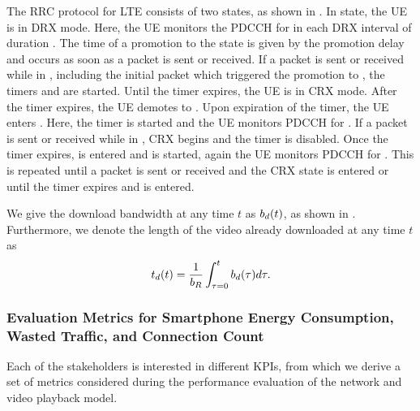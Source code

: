 The \gls{RRC} protocol for \gls{LTE} consists of two states, as shown in .
In \rrcidle state, the \gls{UE} is in \gls{DRX} mode.
Here, the \gls{UE} monitors the \gls{PDCCH} for \tonidle in each \gls{DRX} interval of duration \tdrxidle.
The time of a promotion to the \rrcconnected state is given by the promotion delay \promotiondelay and occurs as soon as a packet is sent or received.
If a packet is sent or received while in \rrcconnected, including the initial packet which triggered the promotion to \rrcconnected, the timers \tdrxinactivity and \tidle are started.
Until the \tdrxinactivity timer expires, the \gls{UE} is in \gls{CRX} mode.
After the \tidle timer expires, the \gls{UE} demotes to \rrcidle.
Upon expiration of the \tdrxinactivity timer, the \gls{UE} enters \shortdrx.
Here, the \tshortdrx timer is started and the \gls{UE} monitors \gls{PDCCH} for \ton.
If a packet is sent or received while in \shortdrx, \gls{CRX} begins and the \tshortdrx timer is disabled.
Once the \tshortdrx timer expires, \longdrx is entered and \tlongdrx is started, again the \gls{UE} monitors \gls{PDCCH} for \ton.
This is repeated until a packet is sent or received and the \gls{CRX} state is entered or until the \tidle timer expires and \rrcidle is entered.

We give the download bandwidth at any time \(t\) as \(b_d(t)\), as shown in .
Furthermore, we denote the length of the video already downloaded at any time \(t\) as 
\begin{equation}
t_d(t) = \frac{1}{b_R} \int_{\tau=0}^t b_d(\tau) d\mathrm{\tau}.
\end{equation}

\subsubsection*{Evaluation Metrics for Smartphone Energy Consumption, Wasted Traffic, and Connection Count}\label{sec:application:lte_video:system_model:model_assumptions:metrics}
Each of the stakeholders is interested in different \glspl{KPI}, from which we derive a set of metrics considered during the performance evaluation of the network and video playback model.

